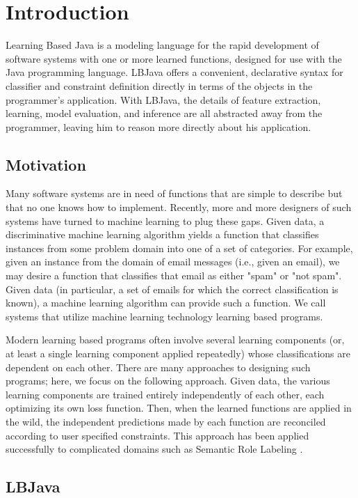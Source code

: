 
\chapter{Introduction}

Learning Based Java is a modeling language for the rapid development of
software systems with one or more learned functions, designed for use with the
Java programming language.  LBJava offers a convenient, declarative syntax for
classifier and constraint definition directly in terms of the objects in the
programmer's application.  With LBJava, the details of feature extraction,
learning, model evaluation, and inference are all abstracted away from the
programmer, leaving him to reason more directly about his application.

\section{Motivation}

Many software systems are in need of functions that are simple to describe but
that no one knows how to implement.  Recently, more and more designers of such
systems have turned to machine learning to plug these gaps.  Given data, a
discriminative machine learning algorithm yields a function that classifies
instances from some problem domain into one of a set of categories.  For
example, given an instance from the domain of email messages (i.e., given an
email), we may desire a function that classifies that email as either "spam"
or "not spam".  Given data (in particular, a set of emails for which the
correct classification is known), a machine learning algorithm can provide
such a function.  We call systems that utilize machine learning technology
learning based programs.

Modern learning based programs often involve several learning components (or,
at least a single learning component applied repeatedly) whose classifications
are dependent on each other.  There are many approaches to designing such
programs; here, we focus on the following approach.  Given data, the various
learning components are trained entirely independently of each other, each
optimizing its own loss function.  Then, when the learned functions are
applied in the wild, the independent predictions made by each function are
reconciled according to user specified constraints.  This approach has been
applied successfully to complicated domains such as Semantic Role Labeling
\cite{PunyakanokRoYi08}.

\section{LBJava}

